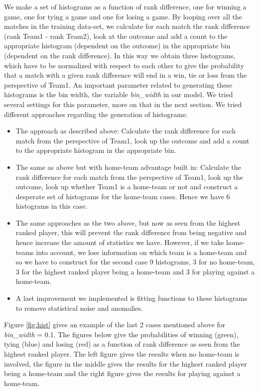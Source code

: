 \documentclass{llncs}
\begin{document}
We make a set of histograms as a function of rank difference, one for winning a game, one for tying a game and one for losing a game. By looping over all the matches in the training data-set, we calculate for each match the rank difference (rank Team1 - rank Team2), look at the outcome and add a count to the appropriate histogram (dependent on the outcome) in the appropriate bin (dependent on the rank difference). In this way we obtain three histograms, which have to be normalized with respect to each other to give the probability that a match with a given rank difference will end in a win, tie or loss from the perspective of Team1. An important parameter related to generating these histograms is the bin width, the variable \emph{bin\_width} in our model. We tried several settings for this parameter, more on that in the next section. We tried different approaches regarding the generation of histograms:

\begin{itemize}
  \item
    The approach as described above: Calculate the rank difference for each match from the perspective of Team1, look up the outcome and add a count to the appropriate histogram in the appropriate bin.
  \item
    The same as above but with home-team advantage built in: Calculate the rank difference for each match from the perspective of Team1, look up the outcome, look up whether Team1 is a home-team or not and construct a desperate set of histograms for the home-team cases. Hence we have 6 histograms in this case.
  \item
    The same approaches as the two above, but now as seen from the highest ranked player, this will prevent the rank difference from being negative and hence increase the amount of statistics we have. However, if we take home-teams into account, we lose information on which team is a home-team and so we have to construct for the second case 9 histograms, 3 for no home-team, 3 for the highest ranked player being a home-team and 3 for playing against a home-team.
  \item
    A last improvement we implemented is fitting functions to these histograms to remove statistical noise and anomalies.
\end{itemize}

Figure \ref{fig:hist} gives an example of the last 2 cases mentioned above for \emph{bin\_width} = 0.1. The figures below give the probabilities of winning (green), tying (blue) and losing (red) as a function of rank difference as seen from the highest ranked player. The left figure gives the results when no home-team is involved, the figure in the middle gives the results for the highest ranked player being a home-team and the right figure gives the results for playing against a home-team.
\end{document}
